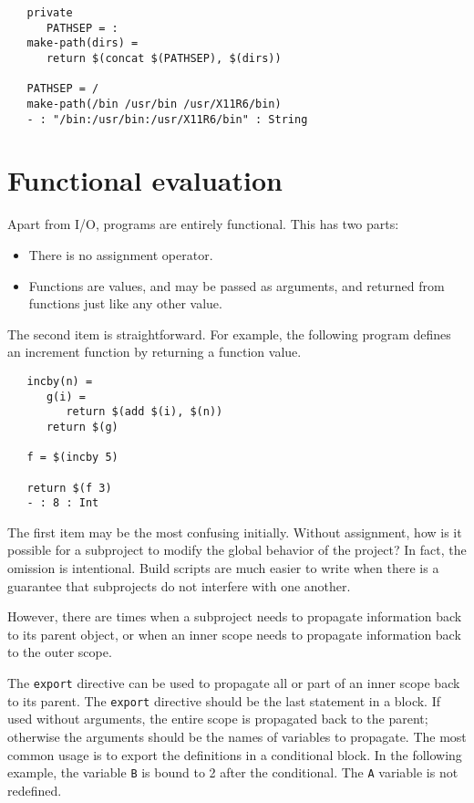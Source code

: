 \begin{verbatim}
   private
      PATHSEP = :
   make-path(dirs) =
      return $(concat $(PATHSEP), $(dirs))

   PATHSEP = /
   make-path(/bin /usr/bin /usr/X11R6/bin)
   - : "/bin:/usr/bin:/usr/X11R6/bin" : String
\end{verbatim}

\section{Functional evaluation}

Apart from I/O,  programs are entirely functional.  This has two parts:

\begin{itemize}
\item There is no assignment operator.
\item Functions are values, and may be passed as arguments, and returned from
      functions just like any other value.
\end{itemize}

The second item is straightforward.  For example, the following program defines
an increment function by returning a function value.

\begin{verbatim}
   incby(n) =
      g(i) =
         return $(add $(i), $(n))
      return $(g)

   f = $(incby 5)

   return $(f 3)
   - : 8 : Int
\end{verbatim}

The first item may be the most confusing initially.  Without assignment, how is
it possible for a subproject to modify the global behavior of the project?  In fact,
the omission is intentional.  Build scripts are much easier to write when there
is a guarantee that subprojects do not interfere with one another.

However, there are times when a subproject needs to propagate
information back to its parent object, or when an inner scope needs to
propagate information back to the outer scope.

The \verb+export+ directive can be used to propagate all or part of an
inner scope back to its parent.  The \verb+export+ directive should be
the last statement in a block.  If used without arguments, the entire
scope is propagated back to the parent; otherwise the arguments should
be the names of variables to propagate.  The most common usage is
to export the definitions in a conditional block.  In the following
example, the variable \verb+B+ is bound to 2 after the conditional.
The \verb+A+ variable is not redefined.


